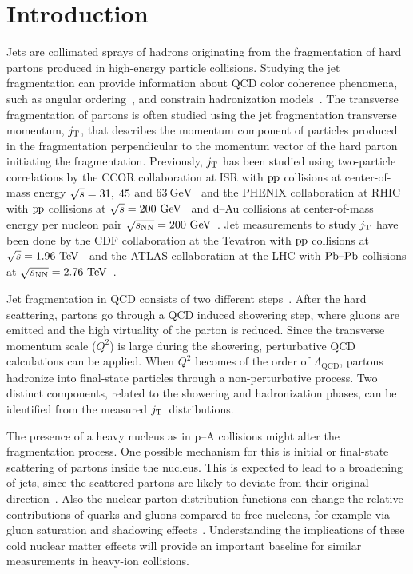 
\section{Introduction}
\label{sec:introduction}

Jets are collimated sprays of hadrons originating from the fragmentation of hard partons produced in high-energy particle collisions. Studying the jet fragmentation can provide information about QCD color coherence phenomena, such as angular ordering~\cite{basicsofpqcd}, and constrain hadronization models~\cite{introPythia81,herwigManual,herwig7releaseNote}. The transverse fragmentation of partons is often studied using the jet fragmentation transverse momentum, $\jt{}$, that describes the momentum component of particles produced in the fragmentation perpendicular to the momentum vector of the hard parton initiating the fragmentation. Previously, $\jt{}$ has been studied using two-particle correlations by the CCOR collaboration at ISR with $\pp$ collisions at center-of-mass energy $\sqrtS = 31,\;45$ and $63~\mathrm{GeV}$~\cite{firstjtmeasurement} and the PHENIX collaboration at RHIC with $\pp$ collisions at $\sqrtSE[GeV]{200}$~\cite{PHENIXjets} and d--Au collisions at center-of-mass energy per nucleon pair $\sqrtSnnE[GeV]{200}$~\cite{phenixJtPAu}. Jet measurements to study $\jt{}$ have been done by the CDF collaboration at the Tevatron with $\ppbar$ collisions at $\sqrtSE{1.96}$~\cite{cdfpaper} and the ATLAS collaboration at the LHC with $\PbPb$ collisions at $\sqrtSnnE{2.76}$~\cite{atlaksenJetit}.

Jet fragmentation in QCD consists of two different steps~\cite{eventGenerators}. After the hard scattering, partons go through a QCD induced showering step, where gluons are emitted and the high virtuality  of the parton is reduced. Since the transverse momentum scale ($Q^{2}$) is large during the showering, perturbative QCD calculations can be applied. When $Q^{2}$ becomes of the order of $\Lambda_{\mathrm{QCD}}$, partons hadronize into final-state particles through a non-perturbative process. Two distinct components, related to the showering and hadronization phases, can be identified from the measured $\jt{}$~distributions.

The presence of a heavy nucleus as in p--A collisions might alter the fragmentation process. One possible mechanism for this is initial or final-state scattering of partons inside the nucleus. This is expected to lead to a broadening of jets, since the scattered partons are likely to deviate from their original direction~\cite{jetBroadeningPpb1}. Also the nuclear parton distribution functions can change the relative contributions of quarks and gluons compared to free nucleons, for example via gluon saturation and shadowing effects~\cite{introCgc,eps09}. Understanding the implications of these cold nuclear matter effects will provide an important baseline for similar measurements in heavy-ion collisions.

